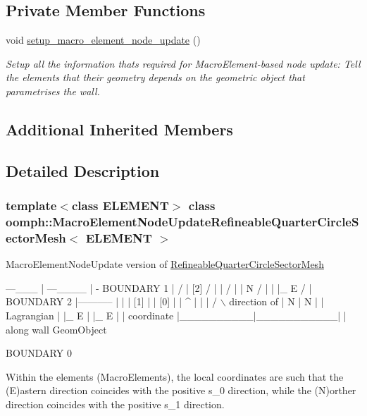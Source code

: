 \subsection*{Private Member Functions}
\begin{DoxyCompactItemize}
\item 
void \hyperlink{classoomph_1_1MacroElementNodeUpdateRefineableQuarterCircleSectorMesh_a94b5efa53ac7689757dad989098df7ed}{setup\+\_\+macro\+\_\+element\+\_\+node\+\_\+update} ()
\begin{DoxyCompactList}\small\item\em Setup all the information that\textquotesingle{}s required for Macro\+Element-\/based node update\+: Tell the elements that their geometry depends on the geometric object that parametrises the wall. \end{DoxyCompactList}\end{DoxyCompactItemize}
\subsection*{Additional Inherited Members}


\subsection{Detailed Description}
\subsubsection*{template$<$class E\+L\+E\+M\+E\+NT$>$\newline
class oomph\+::\+Macro\+Element\+Node\+Update\+Refineable\+Quarter\+Circle\+Sector\+Mesh$<$ E\+L\+E\+M\+E\+N\+T $>$}

Macro\+Element\+Node\+Update version of \hyperlink{classoomph_1_1RefineableQuarterCircleSectorMesh}{Refineable\+Quarter\+Circle\+Sector\+Mesh}


\begin{DoxyCode}
                     ---\_\_\_
                    |      ---\_\_\_\_
                    |              -   BOUNDARY 1
                    |               /  
                    |     [2]      /  |  
                    |             /     | 
                    | N          /        |  
                    | |\_ E      /          |    
     BOUNDARY 2     |-----------           |  
                    |          |    [1]    |
                    |   [0]    |           |  ^
                    |          |           | / \(\backslash\)  direction of
                    | N        |    N      |  |   Lagrangian 
                    | |\_ E     |    |\_ E   |  |   coordinate 
                    |\_\_\_\_\_\_\_\_\_\_|\_\_\_\_\_\_\_\_\_\_\_|  |   along wall GeomObject

                         BOUNDARY 0

Within the elements (MacroElements), the local coordinates
are such that the (E)astern direction coincides with the positive 
s\_0 direction,  \textcolor{keywordflow}{while} the (N)orther direction coincides with the positive 
s\_1 direction.
\end{DoxyCode}


